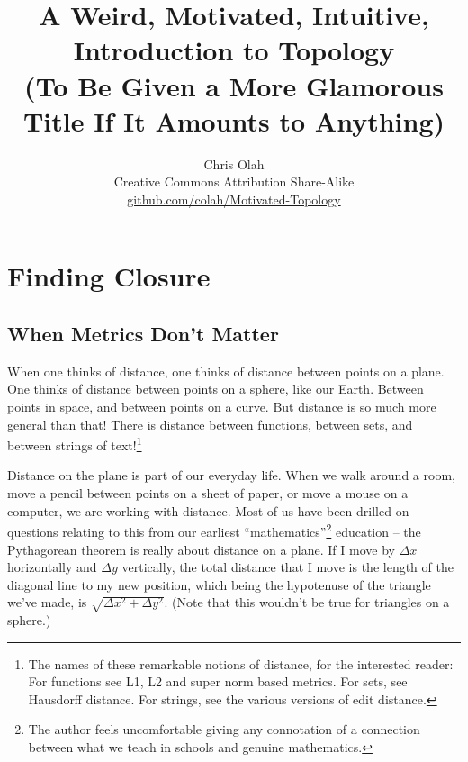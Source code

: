 \documentclass{report}
\begin{document}
\title{A Weird, Motivated, Intuitive, Introduction to Topology\\{\small(To Be Given a More Glamorous Title If It Amounts to Anything)}}
\author{Chris Olah\\ $~$\\ $~$\\ Creative Commons Attribution Share-Alike \\  \href{https://github.com/colah/Motivated-Topology}{github.com/colah/Motivated-Topology}\\ $~$\\}

\maketitle

\tableofcontents

\chapter{Finding Closure}

\section{When Metrics Don't Matter}

When one thinks of distance, one thinks of distance between points on a plane. One thinks of distance between points on a sphere, like our Earth. Between points in space, and between points on a curve. But distance is so much more general than that! There is distance between functions, between sets, and between strings of text!\footnote{The names of these remarkable notions of distance, for the interested reader: For functions see L1, L2 and super norm based metrics. For sets, see Hausdorff distance. For strings, see the various versions of edit distance.}

Distance on the plane is part of our everyday life. When we walk around a room, move a pencil between points on a sheet of paper, or move a mouse on a computer, we are working with distance. Most of us have been drilled on questions relating to this from our earliest ``mathematics''\footnote{The author feels uncomfortable giving any connotation of a connection between what we teach in schools and genuine mathematics.} education -- the Pythagorean theorem is really about distance on a plane. If I move by $Δx$ horizontally and $Δy$ vertically, the total distance that I move is the length of the diagonal line to my new position, which being the hypotenuse of the triangle we've made, is $\sqrt{Δx^2 + Δy^2}$. (Note that this wouldn't be true for triangles on a sphere.)
\end{document}
